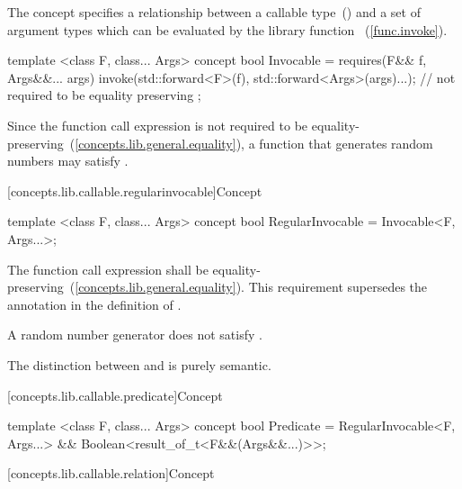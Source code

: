\pnum
The  concept specifies a relationship between a callable
type~()  and a set of argument types  which
can be evaluated by the library function ~(\ref{func.invoke}).

%
\begin{itemdecl}
template <class F, class... Args>
concept bool Invocable =
  requires(F&& f, Args&&... args) {
    invoke(std::forward<F>(f), std::forward<Args>(args)...); // not required to be equality preserving
  };
\end{itemdecl}

\begin{itemdescr}
\pnum
\enternote Since the  function call
expression is not required to be
equality-preserving~(\ref{concepts.lib.general.equality}), a function that generates random numbers
may satisfy .\exitnote
\end{itemdescr}

[concepts.lib.callable.regularinvocable]{Concept }

%
\begin{itemdecl}
template <class F, class... Args>
concept bool RegularInvocable =
  Invocable<F, Args...>;
\end{itemdecl}

\begin{itemdescr}
\pnum
The  function call expression shall be
equality-preserving~(\ref{concepts.lib.general.equality}). \enternote This requirement supersedes the
annotation in the definition of . \exitnote

\pnum
\enternote A random number generator does not satisfy
.\exitnote

\pnum
\enternote The distinction between  and
 is purely semantic.\exitnote
\end{itemdescr}

[concepts.lib.callable.predicate]{Concept }

%
\begin{itemdecl}
template <class F, class... Args>
concept bool Predicate =
  RegularInvocable<F, Args...> &&
  Boolean<result_of_t<F&&(Args&&...)>>;
\end{itemdecl}

[concepts.lib.callable.relation]{Concept }

